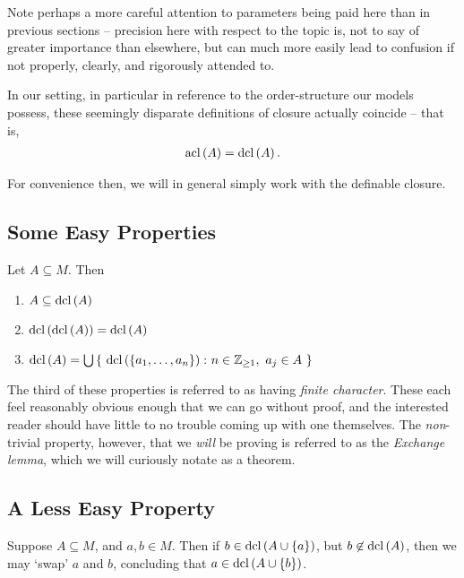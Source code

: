 Note perhaps a more careful attention to parameters being paid here than in previous sections -- precision here with respect to the topic is, not to say of greater importance than elsewhere, but can much more easily lead to confusion if not properly, clearly, and rigorously attended to.


In our setting, in particular in reference to the order-structure our models possess, these seemingly disparate definitions of closure actually coincide -- that is,
\begin{align*}
  \operatorname{acl}\left(A\right) = \operatorname{dcl}\left(A\right).
\end{align*}

For convenience then, we will in general simply work with the definable closure.

\subsection{Some Easy Properties}

\begin{proposition}
\leavevmode
Let $A \subseteq M$. Then
  \begin{enumerate}
    \item $A \subseteq \operatorname{dcl}\left(A\right)$
    \item $\operatorname{dcl}\left(\operatorname{dcl}\left(A\right)\right) = \operatorname{dcl}\left(A\right)$
    \item $\dcl{A} = \bigcup \left\{ \ \dcl{\{a_1, \hdots, a_n\}} \colon n \in \Zgeq{1}, \ a_j \in A \ \right\}$
  \end{enumerate}
\end{proposition}

The third of these properties is referred to as having \emph{finite character}. These each feel reasonably obvious enough that we can go without proof, and the interested reader should have little to no trouble coming up with one themselves. The \emph{non}-trivial property, however, that we \emph{will} be proving is referred to as the \emph{Exchange lemma}, which we will curiously notate as a theorem.

\subsection{A Less Easy Property}

\begin{theorem}
  \label{thm:exchange}
  Suppose $A \subseteq M$, and $a, b \in M$. Then if $b \in \operatorname{dcl}\left(A \cup \{ a \}\right)$, but $b \not\in \operatorname{dcl}\left(A\right)$, then we may `swap' $a$ and $b$, concluding that $a \in \operatorname{dcl}\left(A \cup \{ b \}\right)$.
\end{theorem}

